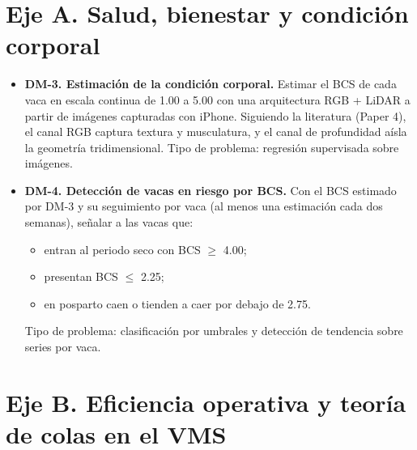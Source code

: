 \documentclass[11pt,letterpaper,DIV=12]{scrartcl}
\begin{document}


\section{Eje A. Salud, bienestar y condición corporal}

\begin{itemize}
  \item \textbf{DM-3. Estimación de la condición corporal.} Estimar el BCS de cada vaca en escala continua de 1.00 a 5.00 con una arquitectura RGB + LiDAR a partir de imágenes capturadas con iPhone. Siguiendo la literatura (Paper 4), el canal RGB captura textura y musculatura, y el canal de profundidad aísla la geometría tridimensional. Tipo de problema: regresión supervisada sobre imágenes.
  \item \textbf{DM-4. Detección de vacas en riesgo por BCS.} Con el BCS estimado por DM-3 y su seguimiento por vaca (al menos una estimación cada dos semanas), señalar a las vacas que:
  \begin{itemize}
    \item entran al periodo seco con BCS $\geq$ 4.00;
    \item presentan BCS $\leq$ 2.25;
    \item en posparto caen o tienden a caer por debajo de 2.75.
  \end{itemize}
  Tipo de problema: clasificación por umbrales y detección de tendencia sobre series por vaca.
\end{itemize}

\section{Eje B. Eficiencia operativa y teoría de colas en el VMS}
\end{document}
